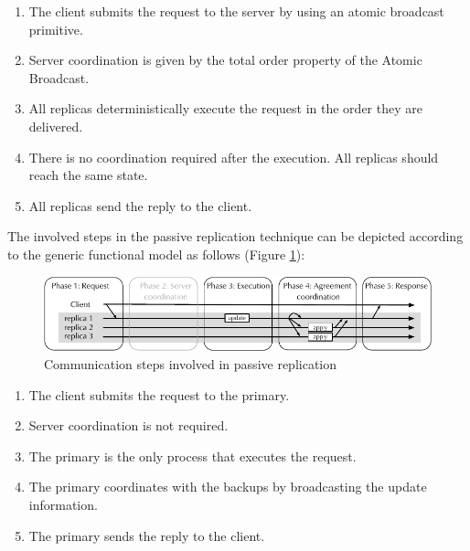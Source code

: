 \begin{enumerate}
  \item The client submits the request to the server by using an atomic
  broadcast primitive.
  \item Server coordination is given by the total order property of the Atomic
  Broadcast.
  \item All replicas deterministically execute the request in the order they are
  delivered.
  \item There is no coordination required after the execution. All replicas
  should reach the same state.
  \item All replicas send the reply to the client.
\end{enumerate}

The involved steps in the passive replication technique can be depicted
according to the generic functional model as follows (Figure
\ref{fig:replication:passive}):

\begin{figure}[ht!]
  \begin{minipage}[b]{1.0\linewidth}
  \centering
        \includegraphics[width=1\linewidth]{figures/replication-passive}
  \end{minipage}
  \caption{Communication steps involved in passive replication}
  \label{fig:replication:passive}
\end{figure}

\begin{enumerate}
  \item The client submits the request to the primary.
  \item Server coordination is not required.
  \item The primary is the only process that executes the request.
  \item The primary coordinates with the backups by broadcasting the update
  information.
  \item The primary sends the reply to the client.
\end{enumerate}




